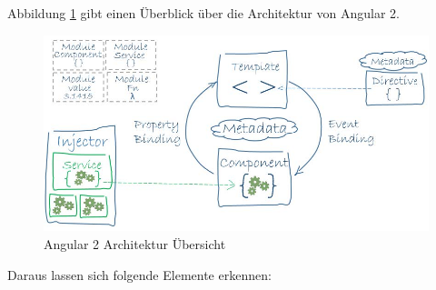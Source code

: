 Abbildung \ref{fig:angular2-architecture} gibt einen Überblick über die Architektur von Angular 2.
\begin{figure}[h!]
\centering
\includegraphics[width=0.7\linewidth]{fig/angular2-architecture}
\caption{Angular 2 Architektur Übersicht}
\label{fig:angular2-architecture}
\end{figure}
Daraus lassen sich folgende Elemente erkennen:
